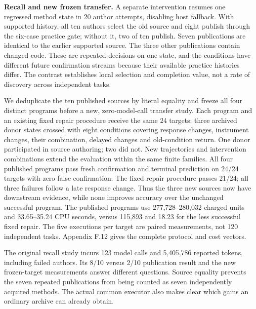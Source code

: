 \documentclass[11pt,a4paper]{article}
\begin{document}
\textbf{Recall and new frozen transfer.} A separate intervention resumes one regressed method state in 20 author attempts, disabling host fallback. With supported history, all ten authors select the old source and eight publish through the six-case practice gate; without it, two of ten publish. Seven publications are identical to the earlier supported source. The three other publications contain changed code. These are repeated decisions on one state, and the conditions have different future confirmation streams because their available practice histories differ. The contrast establishes local selection and completion value, not a rate of discovery across independent tasks.


We deduplicate the ten published sources by literal equality and freeze all four distinct programs before a new, zero-model-call transfer study. Each program and an existing fixed repair procedure receive the same 24 targets: three archived donor states crossed with eight conditions covering response changes, instrument changes, their combination, delayed changes and old-condition return. One donor participated in source authoring; two did not. New trajectories and intervention combinations extend the evaluation within the same finite families. All four published programs pass fresh confirmation and terminal prediction on 24/24 targets with zero false confirmation. The fixed repair procedure passes 21/24; all three failures follow a late response change. Thus the three new sources now have downstream evidence, while none improves accuracy over the unchanged successful program. The published programs use 277,728–280,032 charged units and 33.65–35.24 CPU seconds, versus 115,893 and 18.23 for the less successful fixed repair. The five executions per target are paired measurements, not 120 independent tasks. Appendix F.12 gives the complete protocol and cost vectors.


The original recall study incurs 123 model calls and 5,405,786 reported tokens, including failed authors. Its 8/10 versus 2/10 publication result and the new frozen-target measurements answer different questions. Source equality prevents the seven repeated publications from being counted as seven independently acquired methods. The actual common executor also makes clear which gains an ordinary archive can already obtain.
\end{document}
